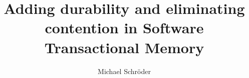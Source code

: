 \documentclass[a4paper,12pt]{book}
\begin{document}
\frontmatter

\title{Adding durability and eliminating contention in Software Transactional Memory}
\author{Michael Schröder}
\date{\draftnotice}
\maketitle
\clearemptydoublepage






\mainmatter







\backmatter


\end{document}
